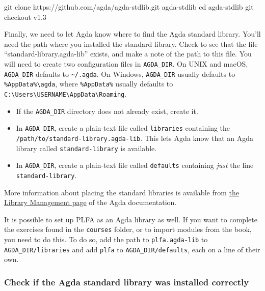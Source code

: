 \begin{myDisplay}
git clone https://github.com/agda/agda-stdlib.git agda-stdlib
cd agda-stdlib
git checkout v1.3
\end{myDisplay}

Finally, we need to let Agda know where to find the Agda standard
library. You'll need the path where you installed the standard library.
Check to see that the file ``standard-library.agda-lib'' exists, and
make a note of the path to this file. You will need to create two
configuration files in \texttt{AGDA\_DIR}. On UNIX and macOS,
\texttt{AGDA\_DIR} defaults to \texttt{\textasciitilde{}/.agda}. On
Windows, \texttt{AGDA\_DIR} usually defaults to
\texttt{\%AppData\%\textbackslash{}agda}, where \texttt{\%AppData\%}
usually defaults to
\texttt{C:\textbackslash{}Users\textbackslash{}USERNAME\textbackslash{}AppData\textbackslash{}Roaming}.

\begin{itemize}
\tightlist
\item
  If the \texttt{AGDA\_DIR} directory does not already exist, create it.
\item
  In \texttt{AGDA\_DIR}, create a plain-text file called
  \texttt{libraries} containing the
  \texttt{/path/to/standard-library.agda-lib}. This lets Agda know that
  an Agda library called \texttt{standard-library} is available.
\item
  In \texttt{AGDA\_DIR}, create a plain-text file called
  \texttt{defaults} containing \emph{just} the line
  \texttt{standard-library}.
\end{itemize}

More information about placing the standard libraries is available from
\href{https://agda.readthedocs.io/en/v2.6.1.3/tools/package-system.html\#example-using-the-standard-library}{the
Library Management page} of the Agda documentation.

It is possible to set up PLFA as an Agda library as well. If you want to
complete the exercises found in the \texttt{courses} folder, or to
import modules from the book, you need to do this. To do so, add the
path to \texttt{plfa.agda-lib} to \texttt{AGDA\_DIR/libraries} and add
\texttt{plfa} to \texttt{AGDA\_DIR/defaults}, each on a line of their
own.

\hypertarget{check-if-the-agda-standard-library-was-installed-correctly}{%
\subsubsection{Check if the Agda standard library was installed
correctly}\label{check-if-the-agda-standard-library-was-installed-correctly}}

